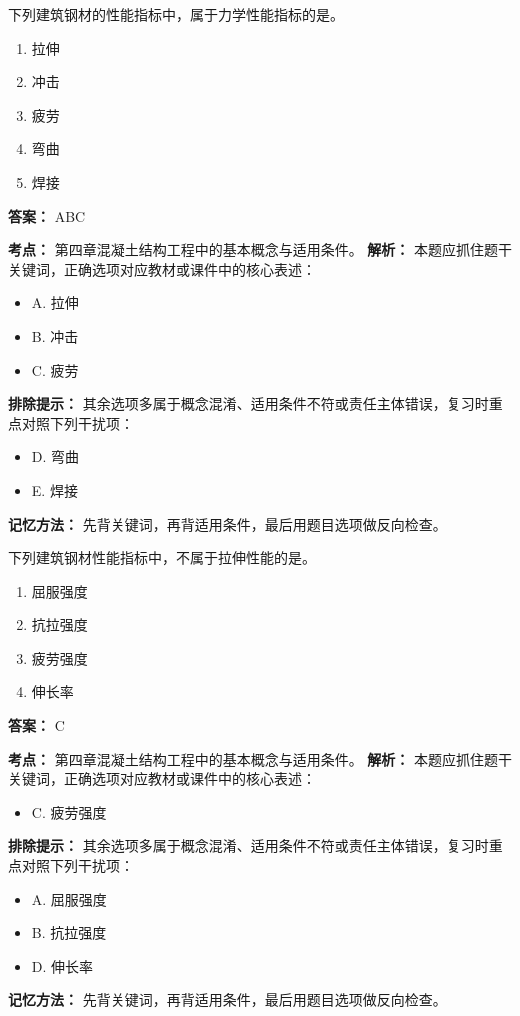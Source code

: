 \documentclass[UTF8,fontset=fandol,11pt]{ctexart}
\begin{document}
\begin{quizbox}[title={第 6 题}]
下列建筑钢材的性能指标中，属于力学性能指标的是。\\
\begin{enumerate}[label=\Alph*.]
\item 拉伸
\item 冲击
\item 疲劳
\item 弯曲
\item 焊接
\end{enumerate}
\textbf{答案：} ABC
\vspace{0.25em}
\begin{answerbox}[title={考点解析}]
\textbf{考点：} 第四章混凝土结构工程中的基本概念与适用条件。
\textbf{解析：} 本题应抓住题干关键词，正确选项对应教材或课件中的核心表述：
\begin{itemize}
\item A. 拉伸
\item B. 冲击
\item C. 疲劳
\end{itemize}
\textbf{排除提示：} 其余选项多属于概念混淆、适用条件不符或责任主体错误，复习时重点对照下列干扰项：
\begin{itemize}
\item D. 弯曲
\item E. 焊接
\end{itemize}
\textbf{记忆方法：} 先背关键词，再背适用条件，最后用题目选项做反向检查。
\end{answerbox}
\end{quizbox}

\begin{quizbox}[title={第 7 题}]
下列建筑钢材性能指标中，不属于拉伸性能的是。\\
\begin{enumerate}[label=\Alph*.]
\item 屈服强度
\item 抗拉强度
\item 疲劳强度
\item 伸长率
\end{enumerate}
\textbf{答案：} C
\vspace{0.25em}
\begin{answerbox}[title={考点解析}]
\textbf{考点：} 第四章混凝土结构工程中的基本概念与适用条件。
\textbf{解析：} 本题应抓住题干关键词，正确选项对应教材或课件中的核心表述：
\begin{itemize}
\item C. 疲劳强度
\end{itemize}
\textbf{排除提示：} 其余选项多属于概念混淆、适用条件不符或责任主体错误，复习时重点对照下列干扰项：
\begin{itemize}
\item A. 屈服强度
\item B. 抗拉强度
\item D. 伸长率
\end{itemize}
\textbf{记忆方法：} 先背关键词，再背适用条件，最后用题目选项做反向检查。
\end{answerbox}
\end{quizbox}
\end{document}
